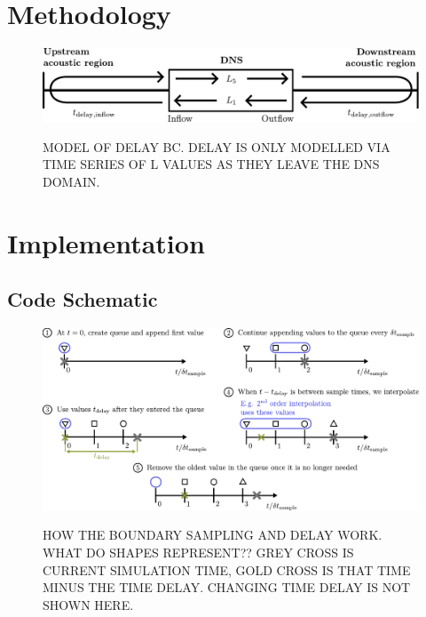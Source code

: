 \section{Methodology}

\begin{figure}[t]
\centering
\includegraphics[scale=0.65]{assets/imgs/delay_bc_model.pdf}
\label{fig:delay-model}
\caption{MODEL OF DELAY BC. DELAY IS ONLY MODELLED VIA TIME SERIES OF L VALUES AS THEY LEAVE THE DNS DOMAIN.}
\end{figure}





\section{Implementation}


\subsection{Code Schematic}

\begin{figure}[t]
\centering
\includegraphics[scale=0.65]{assets/imgs/delay_bc_queue.pdf}
\label{fig:delay-queue}
\caption{HOW THE BOUNDARY SAMPLING AND DELAY WORK. WHAT DO SHAPES REPRESENT?? GREY CROSS IS CURRENT SIMULATION TIME, GOLD CROSS IS THAT TIME MINUS THE TIME DELAY. CHANGING TIME DELAY IS NOT SHOWN HERE.}
\end{figure}

